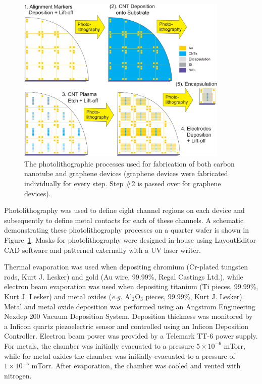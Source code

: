 \documentclass[
  a4paper,
]{scrbook}
\begin{document}
\begin{figure}

{\centering \includegraphics[width=0.9\textwidth,height=\textheight]{./figures/ch4/photolithography-cycle.png}

}

\caption{\label{fig-qw-photolithography}The photolithographic processes
used for fabrication of both carbon nanotube and graphene devices
(graphene devices were fabricated individually for every step. Step \#2
is passed over for graphene devices).}

\end{figure}

Photolithography was used to define eight channel regions on each device
and subsequently to define metal contacts for each of these channels. A
schematic demonstrating these photolithography processes on a quarter
wafer is shown in Figure~\ref{fig-qw-photolithography}. Masks for
photolithography were designed in-house using LayoutEditor CAD software
and patterned externally with a UV laser writer.

Thermal evaporation was used when depositing chromium (Cr-plated
tungsten rods, Kurt J. Lesker) and gold (Au wire, 99.99\%, Regal
Castings Ltd.), while electron beam evaporation was used when depositing
titanium (Ti pieces, 99.99\%, Kurt J. Lesker) and metal oxides
(\emph{e.g.} Al\(_2\)O\(_3\) pieces, 99.99\%, Kurt J. Lesker). Metal and
metal oxide deposition was performed using an Angstrom Engineering
Nexdep 200 Vacuum Deposition System. Deposition thickness was monitored
by a Inficon quartz piezoelectric sensor and controlled using an Inficon
Deposition Controller. Electron beam power was provided by a Telemark
TT-6 power supply. For metals, the chamber was initially evacuated to a
pressure \(5 \times 10^{-6}\) mTorr, while for metal oxides the chamber
was initially evacuated to a pressure of \(1 \times 10^{-5}\) mTorr.
After evaporation, the chamber was cooled and vented with nitrogen.
\end{document}
